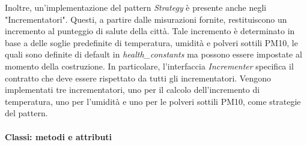 Inoltre, un'implementazione del pattern \textit{Strategy} è presente anche negli "Incrementatori". Questi, a partire dalle misurazioni fornite, restituiscono un incremento al punteggio di salute della città. Tale incremento è determinato in base a delle soglie predefinite di temperatura, umidità e polveri sottili PM10, le quali sono definite di default in \textit{health\_constants} ma possono essere impostate al momento della costruzione. In particolare, l'interfaccia \textit{Incrementer} specifica il contratto che deve essere rispettato da tutti gli incrementatori. Vengono implementati tre incrementatori, uno per il calcolo dell'incremento di temperatura, uno per l'umidità e uno per le polveri sottili PM10, come strategie del pattern.

\paragraph{Classi: metodi e attributi}
